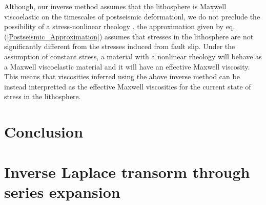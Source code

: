 \documentclass[extra]{gji}
\begin{document}
Although, our inverse method assumes that the lithosphere is Maxwell
viscoelastic on the timescales of postseismic deformationl, we do not
preclude the possibility of a stress-nonlinear rheology \citep[e.g.][]{HK2003}.
the approximation given by eq. (\ref{Postseismic_Approximation})
assumes that stresses in the lithosphere are not significantly
different from the stresses induced from fault slip.  Under the
assumption of constant stress, a material with a nonlinear rheology
will behave as a Maxwell viscoelastic material and it will have an
effective Maxwell viscosity.  This means that viscosities inferred
using the above inverse method can be instead interpretted as the
effective Maxwell viscosities for the current state of stress in the
lithosphere.

\section{Conclusion}

\appendix
\section{Inverse Laplace transorm through series expansion}
\end{document}

